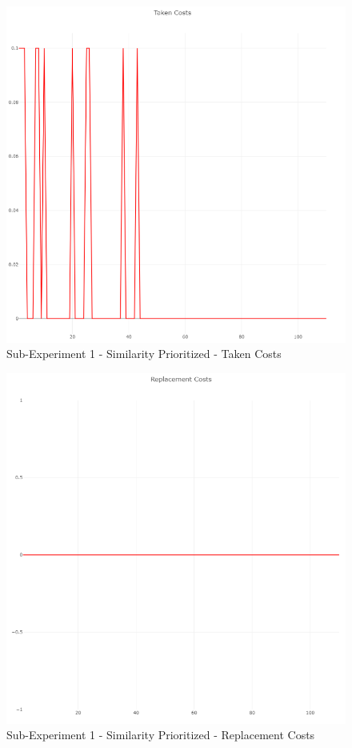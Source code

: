 \begin{figure}[h]
	\centering
	\includegraphics[scale=0.7]{./pictures/similarity_experiment/costs.png}
	\caption{Sub-Experiment 1 - Similarity Prioritized - Taken Costs}
	\label{experiment_similarity_threshold_costs}
\end{figure}

\begin{figure}[h]
	\centering
	\includegraphics[scale=0.7]{./pictures/similarity_experiment/replacement.png}
	\caption{Sub-Experiment 1 - Similarity Prioritized - Replacement Costs}
	\label{experiment_similarity_threshold_rep}
\end{figure}

